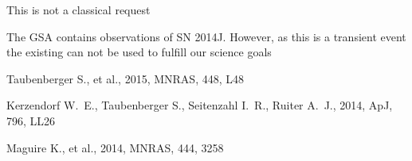\documentclass[11pt]{article}
\begin{document}
\classicalbackup    %
 
This is not a classical request

\bigskip



\justifyduplications

The GSA contains observations of SN 2014J. However, as this is a transient event the existing can not be used to fulfill our science goals

\bigskip


% 

\publications          %
\begin{thebibliography}{99}
 Taubenberger S., et al., 2015, MNRAS, 448, 
L48 

 Kerzendorf W.~E., Taubenberger S., 
Seitenzahl I.~R., Ruiter A.~J., 2014, ApJ, 796, LL26

 Maguire K., et al., 2014, MNRAS, 444, 3258
\end{thebibliography}
\bigskip



%

\end{document}
